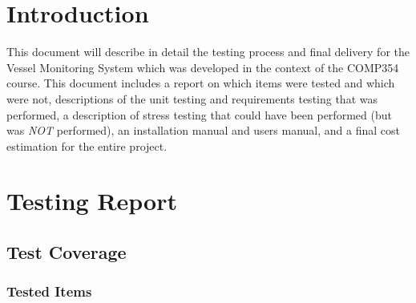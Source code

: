 \documentclass{article}
\begin{document}
\clearpage

\tableofcontents
\clearpage


\section{Introduction} %


This document will describe in detail the testing process and final delivery for the Vessel Monitoring System which was developed in the context of the COMP354 course. This document includes a report on which items were tested and which were not, descriptions of the unit testing and requirements testing that was performed, a description of stress testing that could have been performed (but was \emph{NOT} performed), an installation manual and users manual, and a final cost estimation for the entire project.

\break

\section{Testing Report}


\subsection{Test Coverage}

\subsubsection{Tested Items}

\end{document}
